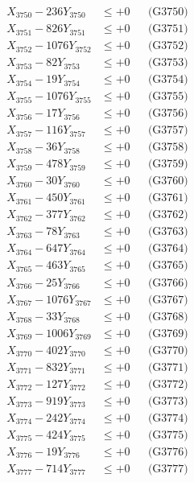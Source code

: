 \documentclass[a4paper,10pt]{article}
\begin{document}
{\begin{align}
X_{3750} - 236Y_{3750} &\leq +0 && \text{(G3750)} \\
\allowbreak
X_{3751} - 826Y_{3751} &\leq +0 && \text{(G3751)} \\
X_{3752} - 1076Y_{3752} &\leq +0 && \text{(G3752)} \\
X_{3753} - 82Y_{3753} &\leq +0 && \text{(G3753)} \\
X_{3754} - 19Y_{3754} &\leq +0 && \text{(G3754)} \\
X_{3755} - 1076Y_{3755} &\leq +0 && \text{(G3755)} \\
X_{3756} - 17Y_{3756} &\leq +0 && \text{(G3756)} \\
X_{3757} - 116Y_{3757} &\leq +0 && \text{(G3757)} \\
X_{3758} - 36Y_{3758} &\leq +0 && \text{(G3758)} \\
X_{3759} - 478Y_{3759} &\leq +0 && \text{(G3759)} \\
X_{3760} - 30Y_{3760} &\leq +0 && \text{(G3760)} \\
\allowbreak
X_{3761} - 450Y_{3761} &\leq +0 && \text{(G3761)} \\
X_{3762} - 377Y_{3762} &\leq +0 && \text{(G3762)} \\
X_{3763} - 78Y_{3763} &\leq +0 && \text{(G3763)} \\
X_{3764} - 647Y_{3764} &\leq +0 && \text{(G3764)} \\
X_{3765} - 463Y_{3765} &\leq +0 && \text{(G3765)} \\
X_{3766} - 25Y_{3766} &\leq +0 && \text{(G3766)} \\
X_{3767} - 1076Y_{3767} &\leq +0 && \text{(G3767)} \\
X_{3768} - 33Y_{3768} &\leq +0 && \text{(G3768)} \\
X_{3769} - 1006Y_{3769} &\leq +0 && \text{(G3769)} \\
X_{3770} - 402Y_{3770} &\leq +0 && \text{(G3770)} \\
\allowbreak
X_{3771} - 832Y_{3771} &\leq +0 && \text{(G3771)} \\
X_{3772} - 127Y_{3772} &\leq +0 && \text{(G3772)} \\
X_{3773} - 919Y_{3773} &\leq +0 && \text{(G3773)} \\
X_{3774} - 242Y_{3774} &\leq +0 && \text{(G3774)} \\
X_{3775} - 424Y_{3775} &\leq +0 && \text{(G3775)} \\
X_{3776} - 19Y_{3776} &\leq +0 && \text{(G3776)} \\
X_{3777} - 714Y_{3777} &\leq +0 && \text{(G3777)} \\

\end{align}}
\end{document}
